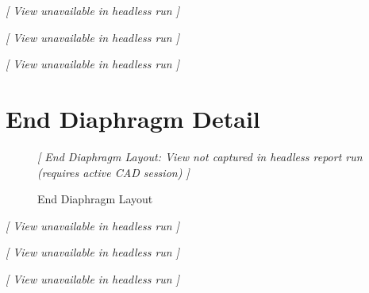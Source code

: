 \documentclass[12pt,a4paper]{report}
\numberwithin{table}{chapter}
\numberwithin{figure}{chapter}
\begin{document}
\noindent
\begin{minipage}[t]{0.31\textwidth}
\centering
\vspace{6pt}
{\scriptsize\itshape [ View unavailable in headless run ]}
\vspace{6pt}
\label{fig:cb-bracing-sec}
\end{minipage}
\hfill
\begin{minipage}[t]{0.31\textwidth}
\centering
\vspace{6pt}
{\scriptsize\itshape [ View unavailable in headless run ]}
\vspace{6pt}
\label{fig:cb-top-chord}
\end{minipage}
\hfill
\begin{minipage}[t]{0.31\textwidth}
\centering
\vspace{6pt}
{\scriptsize\itshape [ View unavailable in headless run ]}
\vspace{6pt}
\label{fig:cb-bottom-chord}
\end{minipage}
            

\section{End Diaphragm Detail}
\label{sec:diaphragm-detail}

\begin{figure}[H]
\centering
\vspace{6pt}
{\small\itshape [ End Diaphragm Layout: View not captured in headless report run (requires active CAD session) ]}
\vspace{6pt}
\caption{End Diaphragm Layout}
\label{fig:ed-layout}
\end{figure}


\noindent
\begin{minipage}[t]{0.31\textwidth}
\centering
\vspace{6pt}
{\scriptsize\itshape [ View unavailable in headless run ]}
\vspace{6pt}
\label{fig:ed-bracing-sec}
\end{minipage}
\hfill
\begin{minipage}[t]{0.31\textwidth}
\centering
\vspace{6pt}
{\scriptsize\itshape [ View unavailable in headless run ]}
\vspace{6pt}
\label{fig:ed-top-chord}
\end{minipage}
\hfill
\begin{minipage}[t]{0.31\textwidth}
\centering
\vspace{6pt}
{\scriptsize\itshape [ View unavailable in headless run ]}
\vspace{6pt}
\label{fig:ed-bottom-chord}
\end{minipage}
\end{document}
